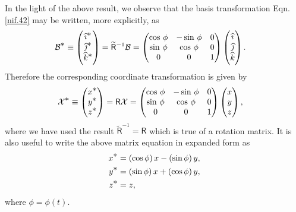 In the light of the above result, we observe that the basis 
transformation Eqn.\eqref{nif.42} may be written, more 
explicitly, as
\begin{align}\label{gt.6}
\mathcal{B}^{\textstyle \ast}&\equiv 
\begin{pmatrix}{\ensuremath{\widehat{\imath}}}^{\textstyle \ast}\\{\widehat{\jmath}}^{\textstyle \ast}\\
{\widehat{k}}^{\textstyle \ast}\end{pmatrix}
=\widetilde{\mathsf{R}}^{-1}\mathcal{B}
=\begin{pmatrix}
\cos\, \phi&-\sin\, \phi&0\\
\sin\,\phi&\cos\,\phi &0\\
0&0&1
\end{pmatrix}
\begin{pmatrix}
{\ensuremath{\widehat{\imath}}}\\{\widehat{\jmath}}\\ {\widehat{k}}\end{pmatrix} .
\end{align}
Therefore the corresponding coordinate transformation is 
given by
\begin{align}
\mathcal{X}^{\textstyle \ast}&\equiv
\begin{pmatrix}
x^{\textstyle \ast}\\ y^{\textstyle \ast} \\ z^{\textstyle \ast}
\end{pmatrix}=\mathsf{R}\mathcal{X}
=\begin{pmatrix}
\cos\, \phi&-\sin\, \phi&0\\
\sin\,\phi&\cos\,\phi &0\\
0&0&1
\end{pmatrix}
\begin{pmatrix}
x\\y\\ z
\end{pmatrix},
\end{align}
where we have used the result 
$\tilde{\mathsf{R}}^{-1}=\mathsf{R}$ which is true of a 
rotation matrix. It is also useful to write the above 
matrix 
equation in expanded form as
\begin{align}
x^{\textstyle \ast}&=(\cos\phi)\, x -(\sin\phi) \,y,\notag\\
y^{\textstyle \ast}&=(\sin\phi)\, x +(\cos\phi) \,y,\notag\\
z^{\textstyle \ast}&=z,
\end{align}
where $\phi =\phi(t)$.
\ebx

